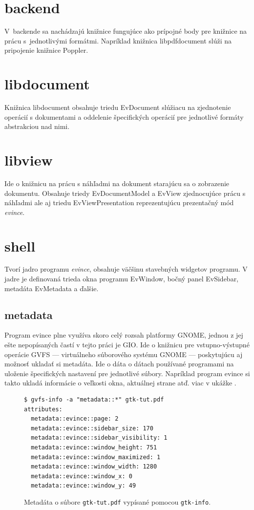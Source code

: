 \documentclass[12pt,oneside,final]{fithesis2}
\begin{document}
\section{backend}
V~backende sa nachádzajú knižnice fungujúce ako prípojné body pre knižnice na prácu s~jednotlivými formátmi. Napríklad knižnica libpdfdocument slúži na pripojenie knižnice Poppler.
\section{libdocument}
Knižnica libdocument obsahuje triedu EvDocument slúžiacu na zjednotenie operácií s dokumentami a oddelenie špecifických operácií pre jednotlivé formáty abstrakciou nad nimi.
\section{libview}
Ide o knižnicu na prácu s náhľadmi na dokument starajúcu sa o zobrazenie dokumentu. Obsahuje triedy EvDocumentModel a EvView zjednocujúce prácu s náhľadmi ale aj triedu EvViewPresentation reprezentujúcu prezentačný mód \emph{evince}.
\section{shell}
Tvorí jadro programu \emph{evince}, obsahuje väčšinu stavebných widgetov programu. V jadre je definovaná trieda okna programu EvWindow, bočný panel EvSidebar, metadáta EvMetadata a ďalšie.
\subsection{metadata}
Program evince plne využíva skoro celý rozsah platformy GNOME, jednou z jej ešte nepopísaných častí v tejto práci je GIO. Ide o knižnicu pre vstupno-výstupné operácie GVFS --- virtuálneho súborového systému GNOME --- poskytujúcu aj možnosť ukladať si metadáta. Ide o dáta o dátach používané programami na uloženie špecifických nastavení pre jednotlivé súbory. Napríklad program evince si takto ukladá informácie o veľkosti okna, aktuálnej strane atď. viac v ukážke \cite{meta}.
\begin{figure}[hbpt]
\begin{tiny}
\begin{verbatim}
$ gvfs-info -a "metadata::*" gtk-tut.pdf 
attributes:
  metadata::evince::page: 2
  metadata::evince::sidebar_size: 170
  metadata::evince::sidebar_visibility: 1
  metadata::evince::window_height: 751
  metadata::evince::window_maximized: 1
  metadata::evince::window_width: 1280
  metadata::evince::window_x: 0
  metadata::evince::window_y: 49
\end{verbatim}
\end{tiny}
\caption{Metadáta o súbore \texttt{gtk-tut.pdf} vypísané pomocou \texttt{gtk-info}.}
\label{meta}
\end{figure}
\end{document}
